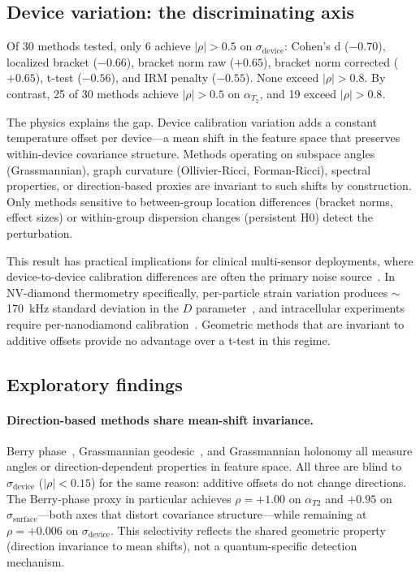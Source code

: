 \documentclass[11pt]{article}
\begin{document}
\subsection{Device variation: the discriminating axis}

Of 30 methods tested, only 6 achieve $|\rho| > 0.5$ on
$\sigma_\text{device}$: Cohen's d ($-0.70$), localized bracket
($-0.66$), bracket norm raw ($+0.65$), bracket norm corrected
($+0.65$), t-test ($-0.56$), and IRM penalty ($-0.55$).
None exceed $|\rho| > 0.8$.
By contrast, 25 of 30 methods achieve $|\rho| > 0.5$ on
$\alpha_{T_2}$, and 19 exceed $|\rho| > 0.8$.

The physics explains the gap.  Device calibration variation adds a
constant temperature offset per device---a mean shift in the feature
space that preserves within-device covariance structure.  Methods
operating on subspace angles (Grassmannian), graph curvature
(Ollivier-Ricci, Forman-Ricci), spectral properties, or
direction-based proxies are invariant to such shifts by construction.
Only methods sensitive to between-group location differences
(bracket norms, effect sizes) or within-group dispersion changes
(persistent H0) detect the perturbation.

This result has practical implications for clinical multi-sensor
deployments, where device-to-device calibration differences are often
the primary noise
source~\citep{johnson2007adjusting,fortin2018harmonization}.  In
NV-diamond thermometry specifically, per-particle strain variation
produces $\sim$170~kHz standard deviation in the $D$
parameter~\citep{fujiwara2024fluorescent}, and intracellular experiments
require per-nanodiamond calibration~\citep{sekiguchi2023simultaneous}.  Geometric methods that are invariant to
additive offsets provide no advantage over a t-test in this regime.

\subsection{Exploratory findings}

\paragraph{Direction-based methods share mean-shift invariance.}
Berry phase~\citep{berry1984quantal}, Grassmannian
geodesic~\citep{edelman1998geometry}, and Grassmannian holonomy all
measure angles or direction-dependent properties in feature space.
All three are blind to $\sigma_\text{device}$ ($|\rho| < 0.15$) for
the same reason: additive offsets do not change directions.  The
Berry-phase proxy in particular achieves $\rho = +1.00$ on
$\alpha_{T2}$ and $+0.95$ on $\sigma_\text{surface}$---both axes
that distort covariance structure---while remaining at $\rho = +0.006$
on $\sigma_\text{device}$.  This selectivity reflects the shared
geometric property (direction invariance to mean shifts), not a
quantum-specific detection mechanism.
\end{document}
